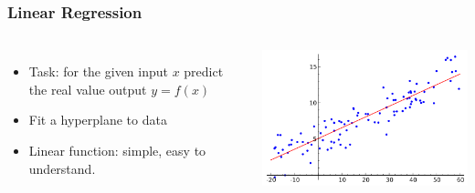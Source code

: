 \begin{frame}
    \frametitle{Linear Regression}
    \begin{columns}
            \begin{itemize}
                \item Task: for the given input $x$ predict the real value output $y = f(x)$ 
                \item Fit a hyperplane to data 
                \item Linear  function: simple, easy to understand.
            \end{itemize}
            \includegraphics[width=1\linewidth]{linreg-pics/lg2}\\

    \end{columns}
\end{frame}



